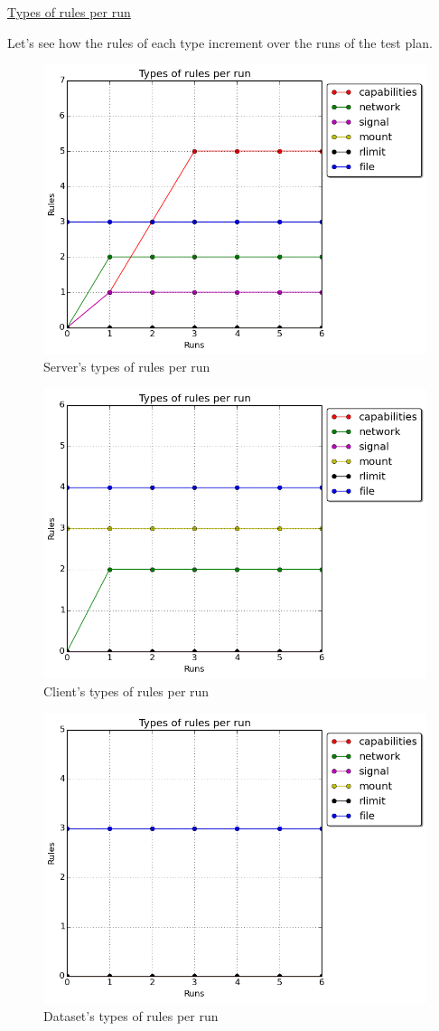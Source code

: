 \underline{Types of rules per run}
\hfill\break

Let's see how the rules of each type increment over the runs of the test plan.

\begin{figure}[h!]
  \centering
   \includegraphics[width=0.64\linewidth]{./figures/mediastreaming/types_cloudsuitemedia-streamingserver.png}
   \caption{Server's types of rules per run}
\end{figure}

\begin{figure}[h!]
  \centering
   \includegraphics[width=0.64\linewidth]{./figures/mediastreaming/types_cloudsuitemedia-streamingclient.png}
   \caption{Client's types of rules per run}
\end{figure}

\begin{figure}[h!]
  \centering
   \includegraphics[width=0.64\linewidth]{./figures/mediastreaming/types_cloudsuitemedia-streamingdataset.png}
   \caption{Dataset's types of rules per run}
\end{figure}
